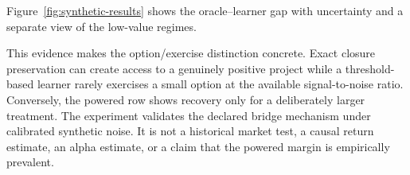 \AORClosureOptionTable

Figure~\ref{fig:synthetic-results} shows the oracle--learner gap with
uncertainty and a separate view of the low-value regimes.


This evidence makes the option/exercise distinction concrete. Exact closure
preservation can create access to a genuinely positive project while a
threshold-based learner rarely exercises a small option at the
available signal-to-noise ratio. Conversely, the powered row shows recovery
only for a deliberately larger treatment. The experiment validates the
declared bridge mechanism under calibrated synthetic noise. It is not a
historical market test, a causal return estimate, an alpha estimate, or a
claim that the powered margin is empirically prevalent.
